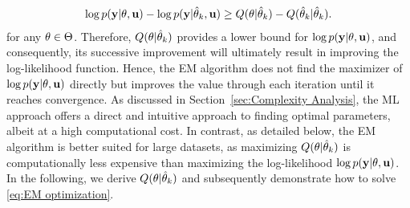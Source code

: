 \begin{equation} \label{eq:Q convengence_2}
    \begin{split}
        \log p(\mathbf{y}|{ \mathrm{\theta} },\mathbf{u}) 
        - 
        \log p(\mathbf{y}|\hat{{ \mathrm{\theta} }}_k,\mathbf{u}) 
        \ge 
        Q({ \mathrm{\theta} }|\hat{{ \mathrm{\theta} }}_k) - Q(\hat{{ \mathrm{\theta} }}_k|\hat{{ \mathrm{\theta} }}_k).
    \end{split}
\end{equation}
for any ${ \mathrm{\theta} }\in\Theta$. 
Therefore, $Q({ \mathrm{\theta} }|\hat{{ \mathrm{\theta} }}_k)$ provides a lower bound for $\log p(\mathbf{y}|{ \mathrm{\theta} },\mathbf{u})$, and consequently, its successive improvement will ultimately result in improving the log-likelihood function. Hence, the EM algorithm does not find the maximizer of $\log p(\mathbf{y}|{ \mathrm{\theta} },\mathbf{u})$ directly but improves the value through each iteration until it reaches convergence. 
%
As discussed in Section~\ref{sec:Complexity Analysis}, the ML approach offers a direct and intuitive approach to finding optimal parameters, albeit at a high computational cost. In contrast, as detailed below, the EM algorithm is better suited for large datasets, as maximizing $Q({ \mathrm{\theta} }|\hat{{ \mathrm{\theta} }}_k)$ is computationally less expensive than maximizing the log-likelihood $\log p(\mathbf{y}|{ \mathrm{\theta} },\mathbf{u})$. 
In the following, we derive $Q({ \mathrm{\theta} }|\hat{{ \mathrm{\theta} }}_k)$ and subsequently demonstrate how to solve \eqref{eq:EM optimization}.

